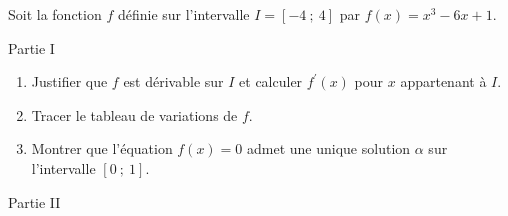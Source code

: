 
%
Soit la fonction $f$ définie sur l'intervalle $I=[-4\ ; \ 4]$ par $f(x)=x^3-6x+1$.
\begin{h3}Partie I\end{h3}
\begin{enumerate}
     \item
     Justifier que $f$ est dérivable sur $I$ et calculer $f^{\prime}(x)$ pour $x$ appartenant à $I$.
     \item
     Tracer le tableau de variations de $f$.
     \item
     Montrer que l'équation $f(x)=0$ admet une unique solution $\alpha $ sur l'intervalle $[0~;~1]$.
\end{enumerate}
\par
\begin{h3}Partie II\end{h3}
